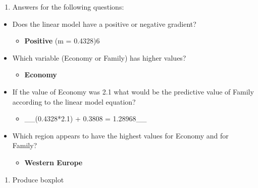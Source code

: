 \documentclass[]{book}
\providecommand{\tightlist}{%
  \setlength{\itemsep}{0pt}\setlength{\parskip}{0pt}}
\begin{document}
\begin{enumerate}
\def\labelenumi{\arabic{enumi}.}
\setcounter{enumi}{4}
\tightlist
\item
  Answers for the following questions:
\end{enumerate}

\begin{itemize}
\tightlist
\item
  Does the linear model have a positive or negative gradient?

  \begin{itemize}
  \tightlist
  \item
    \textbf{Positive} (m = 0.4328)6
  \end{itemize}
\item
  Which variable (Economy or Family) has higher values?

  \begin{itemize}
  \tightlist
  \item
    \textbf{Economy}
  \end{itemize}
\item
  If the value of Economy was 2.1 what would be the predictive value of
  Family according to the linear model equation?

  \begin{itemize}
  \tightlist
  \item
    \_\_(0.4328*2.1) + 0.3808 = 1.28968\_\_
  \end{itemize}
\item
  Which region appears to have the highest values for Economy and for
  Family?

  \begin{itemize}
  \tightlist
  \item
    \textbf{Western Europe}
  \end{itemize}
\end{itemize}

\begin{enumerate}
\def\labelenumi{\arabic{enumi}.}
\setcounter{enumi}{5}
\tightlist
\item
  Produce boxplot
\end{enumerate}
\end{document}
